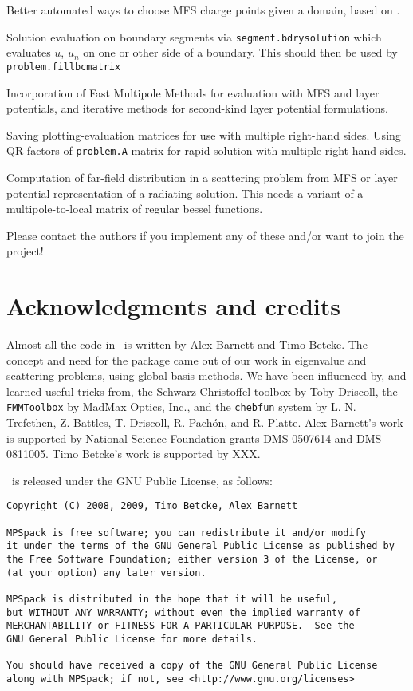 \documentclass[12pt]{article}
\begin{document}
\item Better automated ways to choose MFS charge points given a domain,
based on \cite{mfs}.

\item Solution evaluation on boundary segments via {\tt segment.bdrysolution}
 which evaluates $u$, $u_n$ on one
or other side of a boundary.
This should then be used by {\tt problem.fillbcmatrix}

\item Incorporation of Fast Multipole Methods for evaluation with MFS and
layer potentials, and iterative
methods for second-kind layer potential formulations.

\item Saving plotting-evaluation matrices
for use with multiple right-hand sides.
Using QR factors of {\tt problem.A} matrix
for rapid solution with multiple right-hand sides.

\item Computation of far-field distribution in a scattering problem
from MFS or layer potential
representation of a radiating solution. This needs a variant of a
multipole-to-local matrix of regular bessel functions.
\ei

Please contact the authors if you implement any of these and/or want
to join the project!



\section{Acknowledgments and credits}

Almost all the code in \mpspack\ is written by 
Alex Barnett and Timo Betcke.
The concept and need for the package came out of our work in eigenvalue
and scattering problems, using global basis methods.
We have been influenced by, and learned useful tricks from,
the Schwarz-Christoffel toolbox by Toby Driscoll,
the {\tt FMMToolbox} by MadMax Optics, Inc.,
and the {\tt chebfun} system
by L. N. Trefethen, Z. Battles, T. Driscoll, R. Pach\'{o}n, and R. Platte.
Alex Barnett's work is supported by National Science Foundation
grants DMS-0507614 and DMS-0811005.
Timo Betcke's work is supported by XXX.

\mpspack\ is released under the GNU Public License, as follows:
\begin{verbatim}
Copyright (C) 2008, 2009, Timo Betcke, Alex Barnett

MPSpack is free software; you can redistribute it and/or modify
it under the terms of the GNU General Public License as published by
the Free Software Foundation; either version 3 of the License, or
(at your option) any later version.

MPSpack is distributed in the hope that it will be useful,
but WITHOUT ANY WARRANTY; without even the implied warranty of
MERCHANTABILITY or FITNESS FOR A PARTICULAR PURPOSE.  See the
GNU General Public License for more details.

You should have received a copy of the GNU General Public License
along with MPSpack; if not, see <http://www.gnu.org/licenses>
\end{verbatim}
\end{document}
